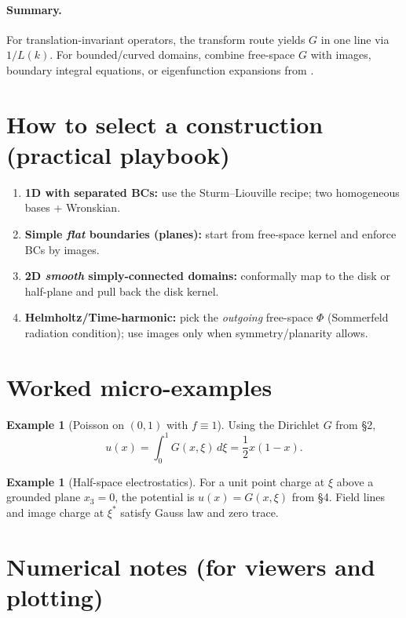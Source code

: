 \documentclass[11pt]{article}
\theoremstyle{definition}
\newtheorem{example}[theorem]{Example}
\theoremstyle{remark}
\begin{document}
	\paragraph{Summary.}
	For translation-invariant operators, the transform route yields $G$ in one line via $1/L(k)$.
	For bounded/curved domains, combine free-space $G$ with images, boundary integral equations,
	or eigenfunction expansions from .
	
	
	
	\section{How to select a construction (practical playbook)}
	
	\begin{enumerate}[(1)]
		\item \textbf{1D with separated BCs:} use the Sturm–Liouville recipe; two homogeneous bases + Wronskian.
		\item \textbf{Simple \emph{flat} boundaries (planes):} start from free-space kernel and enforce BCs by images.
		\item \textbf{2D \emph{smooth} simply-connected domains:} conformally map to the disk or half-plane and pull back
		the disk kernel.
		\item \textbf{Helmholtz/Time-harmonic:} pick the \emph{outgoing} free-space $\Phi$ (Sommerfeld radiation condition);
		use images only when symmetry/planarity allows.
	\end{enumerate}
	
	\section{Worked micro-examples}
	
	\begin{example}[Poisson on $(0,1)$ with $f\equiv1$]
		Using the Dirichlet $G$ from \S2,
		\[
		u(x)=\int_0^1 G(x,\xi)\,d\xi=\frac12 x(1-x).
		\]
	\end{example}
	
	\begin{example}[Half-space electrostatics]
		For a unit point charge at $\xi$ above a grounded plane $x_3=0$, the potential is
		$u(x)=G(x,\xi)$ from \S4. Field lines and image charge at $\xi^\ast$ satisfy Gauss law and zero trace.
	\end{example}
	
	\section{Numerical notes (for viewers and plotting)}
	
\end{document}
